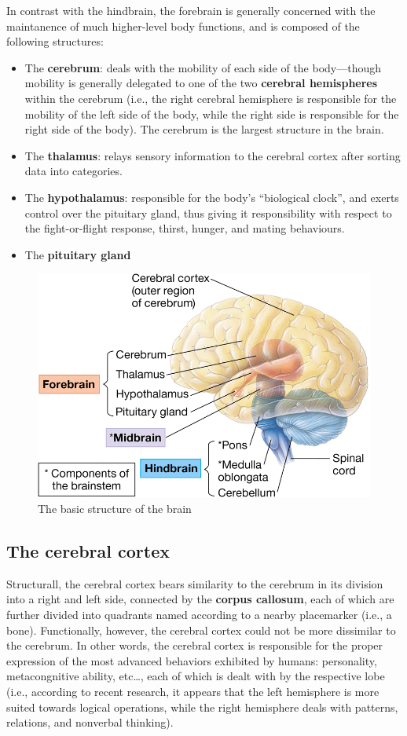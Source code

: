\documentclass{article}
\begin{document}
In contrast with the hindbrain, the forebrain is generally concerned with the
maintanence of much higher-level body functions, and is composed of the
following structures:

\begin{itemize}
	\item The \textbf{cerebrum}: deals with the mobility of each side of the
		body---though mobility is generally delegated to one of the two
		\textbf{cerebral hemispheres} within the cerebrum (i.e., the right
		cerebral hemisphere is responsible for the mobility of the left side
		of the body, while the right side is responsible for the right side of
		the body). The cerebrum is the largest structure in the brain.
	\item The \textbf{thalamus}: relays sensory information to the cerebral
		cortex after sorting data into categories.
	\item The \textbf{hypothalamus}: responsible for the body's ``biological
		clock'', and exerts control over the pituitary gland, thus giving it
		responsibility with respect to the fight-or-flight response, thirst,
		hunger, and mating behaviours.
	\item The \textbf{pituitary gland}
\end{itemize}

\begin{figure}[h]
	\centering
	\includegraphics[width=0.45\linewidth]{basic_brain_structure.png}
	\caption{The basic structure of the brain}
\end{figure}

\subsection{The cerebral cortex}

Structurall, the cerebral cortex bears similarity to the cerebrum in its
division into a right and left side, connected by the \textbf{corpus callosum},
each of which are further divided into quadrants named according to a nearby
placemarker (i.e., a bone). Functionally, however, the cerebral cortex could
not be more dissimilar to the cerebrum. In other words, the cerebral cortex is
responsible for the proper expression of the most advanced behaviors exhibited
by humans: personality, metacongnitive ability, etc\ldots, each of which is
dealt with by the respective lobe (i.e., according to recent research, it
appears that the left hemisphere is more suited towards logical operations, while
the right hemisphere deals with patterns, relations, and nonverbal thinking).
\end{document}

